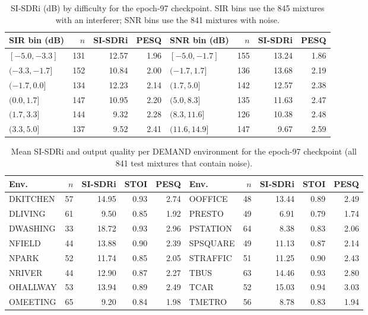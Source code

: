 \documentclass[11pt,a4paper]{article}
\newcommand{\sisdri}{SI-SDRi}
\begin{document}
\begin{table}[htbp]
\centering\footnotesize
\caption{\sisdri{} (dB) by difficulty for the epoch-97 checkpoint. SIR bins use the 845 mixtures
with an interferer; SNR bins use the 841 mixtures with noise.}
\label{tab:sirdifficulty}
\begin{tabular}{@{}lrrr@{\hspace{1.2cm}}lrrr@{}}
\toprule
SIR bin (dB) & $n$ & \sisdri{} & PESQ & SNR bin (dB) & $n$ & \sisdri{} & PESQ\\
\midrule
$[-5.0,-3.3]$ & 131 & 12.57 & 1.96 & $[-5.0,-1.7]$ & 155 & 13.24 & 1.86\\
$(-3.3,-1.7]$ & 152 & 10.84 & 2.00 & $(-1.7,1.7]$ & 136 & 13.68 & 2.19\\
$(-1.7,0.0]$ & 134 & 12.23 & 2.14 & $(1.7,5.0]$ & 142 & 12.57 & 2.38\\
$(0.0,1.7]$ & 147 & 10.95 & 2.20 & $(5.0,8.3]$ & 135 & 11.63 & 2.47\\
$(1.7,3.3]$ & 144 & 9.32 & 2.28 & $(8.3,11.6]$ & 126 & 10.38 & 2.48\\
$(3.3,5.0]$ & 137 & 9.52 & 2.41 & $(11.6,14.9]$ & 147 & 9.67 & 2.59\\
\bottomrule
\end{tabular}
\end{table}

\begin{table}[htbp]
\centering\footnotesize
\caption{Mean \sisdri{} and output quality per DEMAND environment for the epoch-97 checkpoint
(all 841 test mixtures that contain noise).}
\label{tab:noiseenv}
\begin{tabular}{@{}lrrrr@{\hspace{0.8cm}}lrrrr@{}}
\toprule
Env. & $n$ & \sisdri{} & STOI & PESQ & Env. & $n$ & \sisdri{} & STOI & PESQ\\
\midrule
DKITCHEN & 57 & 14.95 & 0.93 & 2.74 & OOFFICE & 48 & 13.44 & 0.89 & 2.49\\
DLIVING & 61 & 9.50 & 0.85 & 1.92 & PRESTO & 49 & 6.91 & 0.79 & 1.74\\
DWASHING & 33 & 18.72 & 0.93 & 2.96 & PSTATION & 64 & 8.38 & 0.83 & 2.06\\
NFIELD & 44 & 13.88 & 0.90 & 2.39 & SPSQUARE & 49 & 11.13 & 0.87 & 2.14\\
NPARK & 52 & 11.74 & 0.85 & 2.05 & STRAFFIC & 51 & 11.25 & 0.90 & 2.43\\
NRIVER & 44 & 12.90 & 0.87 & 2.27 & TBUS & 63 & 14.46 & 0.93 & 2.80\\
OHALLWAY & 53 & 13.94 & 0.89 & 2.49 & TCAR & 52 & 15.03 & 0.94 & 3.03\\
OMEETING & 65 & 9.20 & 0.84 & 1.98 & TMETRO & 56 & 8.78 & 0.83 & 1.94\\
\bottomrule
\end{tabular}
\end{table}
\end{document}
